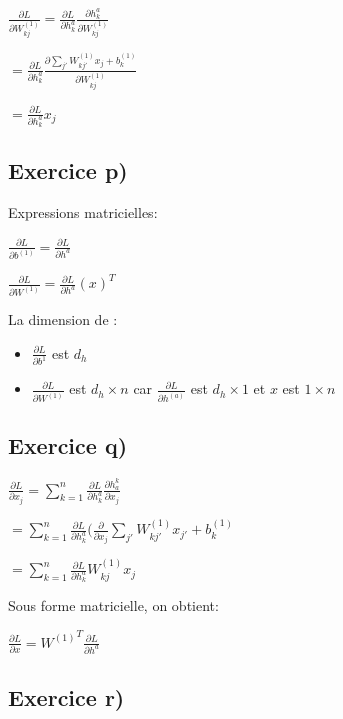 \documentclass[a4paper,10pt]{article}
\begin{document}
$\frac{\partial L}{\partial W^{(1)}_{kj}} = \frac{\partial L}{\partial h^{a}_{k}} \frac{\partial h^{a}_{k}}{\partial W^{(1)}_{kj}} $

$ = \frac{\partial L}{\partial h^{a}_{k}} \frac{\partial \sum_{j'} W^{(1)}_{kj'} x_{j} + b^{(1)}_{k}}{\partial W^{(1)}_{kj}}$

$ = \frac{\partial L}{\partial h^{a}_{k}} x_{j} $


\subsection{Exercice p)}

Expressions matricielles:

$\frac{\partial L}{\partial b^{(1)}} = \frac{\partial L}{\partial h^a}$

$\frac{\partial L}{\partial W^{(1)}} = \frac{\partial L}{\partial h^a}(x)^T$

La dimension de :
\begin{itemize}
	\item $\frac{\partial L}{\partial b^{1}}$ est $d_{h}$
	\item $\frac{\partial L}{\partial W^{(1)}}$ est $d_{h} \times n$ car  $\frac{\partial L}{\partial h^{(a)}}$ est $d_{h} \times 1$ et $ x $ est $1 \times n$
\end{itemize}


\subsection{Exercice q)}

$\frac{\partial L}{\partial x_j} = \sum_{k=1}^{n} \frac{\partial L}{\partial h_k^a} \frac{\partial h_a^k}{\partial x_j}$

$ = \sum_{k=1}^{n} \frac{\partial L}{\partial h_k^a} (\frac{\partial }{\partial x_j} \sum_{j'} W^{(1)}_{kj'} x_{j'} + b^{(1)}_k$

$ = \sum_{k=1}^{n} \frac{\partial L}{\partial h_k^a} W^{(1)}_{kj} x_{j}$

Sous forme matricielle, on obtient:

$\frac{\partial L}{\partial x} = {W^{(1)}}^T \frac{\partial L}{\partial h^a}$


\subsection{Exercice r)}
\end{document}
